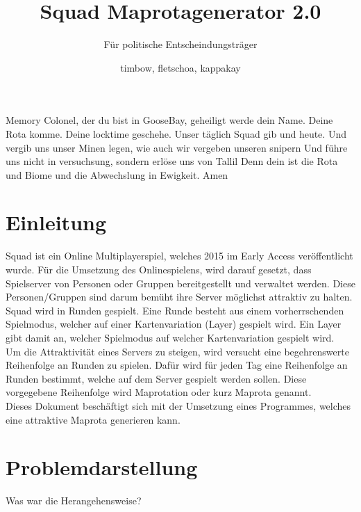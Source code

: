 \documentclass[a4paper, 11pt]{scrartcl}
\title{Squad Maprotagenerator 2.0}
\subtitle{Für politische Entscheindungsträger}
\author{timbow, fletschoa, kappakay}
\begin{document}
    
    \maketitle
    
    \tableofcontents
    \newpage

    Memory Colonel, der du bist in GooseBay, geheiligt werde dein Name.
    Deine Rota komme.
    Deine locktime geschehe.
    Unser täglich Squad gib und heute. Und vergib uns unser Minen legen, wie auch wir vergeben unseren snipern
    Und führe uns nicht in versuchsung, sondern erlöse uns von Tallil
    Denn dein ist die Rota und Biome und die Abwechslung in Ewigkeit.
    Amen

    \newpage
    \listoffigures
    \label{sec:abkuerzungverzeichnis}
    \newpage

    
    
    \section{Einleitung}
        Squad ist ein Online Multiplayerspiel, welches 2015 im \glqq{}Early Access\grqq{} veröffentlicht wurde.\cite{steampage}
        Für die Umsetzung des Onlinespielens, wird darauf gesetzt, 
        dass Spielserver von Personen oder Gruppen bereitgestellt und verwaltet werden.
        \cite{wiki.serverbrowser}
        Diese Personen/Gruppen sind darum bemüht ihre Server möglichst attraktiv zu halten. \\
        Squad wird in Runden gespielt. Eine Runde besteht aus einem vorherrschenden Spielmodus, 
        welcher auf einer Kartenvariation (Layer) gespielt wird. 
        Ein Layer gibt damit an, welcher Spielmodus auf welcher Kartenvariation gespielt wird.\\ 
        Um die Attraktivität eines Servers zu steigen, wird versucht eine begehrenswerte Reihenfolge an Runden zu spielen.
        Dafür wird für jeden Tag eine Reihenfolge an Runden bestimmt, welche auf dem Server gespielt werden sollen.
        Diese vorgegebene Reihenfolge wird Maprotation oder kurz Maprota genannt.\\
        Dieses Dokument beschäftigt sich mit der Umsetzung eines Programmes, welches eine attraktive Maprota generieren kann.   

    \section{Problemdarstellung}
        Was war die Herangehensweise?
\end{document}
